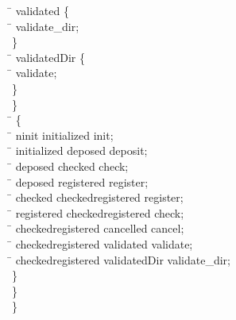 \begin{program}
\>  \>  \>  \=   validated \{\\
\>  \>  \>  \>  \=    validate_dir;\\
\>  \>  \>  \}\\
\>  \>  \>  \=   validatedDir \{\\
\>  \>  \>  \>  \=    validate;\\
\>  \>  \>  \}\\
\>  \>  \}\\
\>  \>  \=   \{\\
\>  \>  \>  \=    ninit  initialized  init;\\
\>  \>  \>  \=    initialized  deposed  deposit;\\
\>  \>  \>  \=    deposed  checked  check;\\
\>  \>  \>  \=    deposed  registered  register;\\
\>  \>  \>  \=    checked  checkedregistered  register;\\
\>  \>  \>  \=    registered  checkedregistered  check;\\
\>  \>  \>  \=    checkedregistered  cancelled  cancel;\\
\>  \>  \>  \=    checkedregistered  validated  validate;\\
\>  \>  \>  \=    checkedregistered  validatedDir  validate_dir;\\
\>  \>  \}\\
\>  \}\\
\}
\end{program}